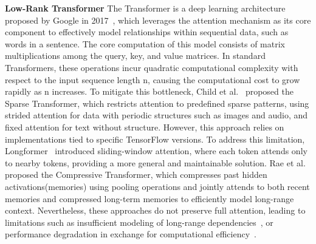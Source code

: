 \documentclass[sigconf,anonymous,review,balance=false]{acmart}
\begin{document}
\textbf{Low-Rank Transformer}
The Transformer is a deep learning architecture proposed by Google in 2017~\cite{OriginalTransformer}, which leverages the attention mechanism as its core component to effectively model relationships within sequential data, such as words in a sentence. 
The core computation of this model consists of matrix multiplications among the query, key, and value matrices. In standard Transformers, these operations incur quadratic computational complexity with respect to the input sequence length n, causing the computational cost to grow rapidly as n increases. To mitigate this bottleneck, Child et al.~\cite{SparseTransformer} proposed the Sparse Transformer, which restricts attention to predefined sparse patterns, using strided attention for data with periodic structures such as images and audio, and fixed attention for text without structure. However, this approach relies on implementations tied to specific TensorFlow versions. To address this limitation, Longformer~\cite{Longformer} introduced sliding-window attention, where each token attends only to nearby tokens, providing a more general and maintainable solution. Rae et al.~\cite{CompressiveTransformer} proposed the Compressive Transformer, which compresses past hidden activations(memories) using pooling operations and jointly attends to both recent memories and compressed long-term memories to efficiently model long-range context. Nevertheless, these approaches do not preserve full attention, leading to limitations such as insufficient modeling of long-range dependencies~\cite{SparseTransformer, Longformer}, or performance degradation in exchange for computational efficiency~\cite{Longformer}.
\end{document}
